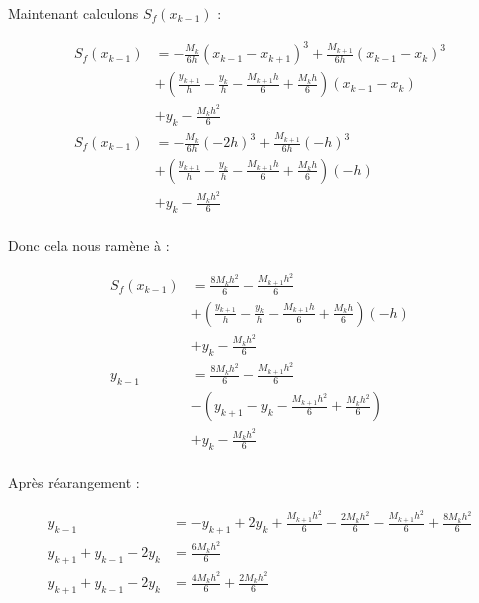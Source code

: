 \documentclass[12pt, letterpaper]{article}
\begin{document}
\begin{enumerate}
\begin{enumerate}
    Maintenant calculons $S_f(x_{k - 1})$ :

    \begin{equation*}
      \begin{split}
        S_f(x_{k - 1}) & = - \frac{M_k}{6h} (x_{k - 1} - x_{k + 1})^3 + 
        \frac{M_{k + 1}}{6h} (x_{k - 1} - x_k)^3 \\
        & + \left( \frac{y_{k + 1}}{h} - \frac{y_k}{h} - \frac{M_{k
            + 1} h}{6} + \frac{M_k h}{6} \right) (x_{k - 1} - x_k) \\
        & + y_k - \frac{M_k h^2}{6} \\
        S_f(x_{k - 1}) & = - \frac{M_k}{6h} (- 2h)^3 + 
        \frac{M_{k + 1}}{6h} (-h)^3 \\
        & + \left( \frac{y_{k + 1}}{h} - \frac{y_k}{h} - \frac{M_{k
            + 1} h}{6} + \frac{M_k h}{6} \right) (-h) \\
        & + y_k - \frac{M_k h^2}{6} \\
      \end{split}
    \end{equation*}

    Donc cela nous ramène à :
    
    \begin{equation*}
      \begin{split}
        S_f(x_{k - 1}) & = \frac{8 M_k h^2}{6} - 
        \frac{M_{k + 1} h^2}{6}\\
        & + \left( \frac{y_{k + 1}}{h} - \frac{y_k}{h} - \frac{M_{k
            + 1} h}{6} + \frac{M_k h}{6} \right) (-h) \\
        & + y_k - \frac{M_k h^2}{6} \\
        y_{k - 1} & = \frac{8 M_k h^2}{6} - 
        \frac{M_{k + 1} h^2}{6}\\
        & - \left( y_{k + 1} - y_k - \frac{M_{k
            + 1} h^2}{6} + \frac{M_k h^2}{6} \right) \\
        & + y_k - \frac{M_k h^2}{6} \\
      \end{split}
    \end{equation*}

    Après réarangement :

    \begin{equation*}
      \begin{split}
        y_{k - 1} & = - y_{k + 1} + 2 y_k + \frac{M_{k
            + 1} h^2}{6} - \frac{2 M_k h^2}{6} - \frac{M_{k + 1}
          h^2}{6} + \frac{8 M_k h^2}{6} \\
        y_{k + 1} + y_{k - 1} - 2 y_k & = \frac{6 M_k h^2}{6} \\
        y_{k + 1} + y_{k - 1} - 2 y_k & = \frac{4 M_k h^2}{6} + \frac{2 M_k h^2}{6}\\
      \end{split}
    \end{equation*}


\end{enumerate}
\end{enumerate}
\end{document}
